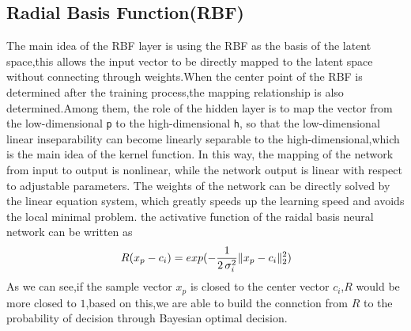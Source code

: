 \subsection{Radial Basis Function(RBF)}
The main idea of the RBF layer is using the RBF as the basis of the latent space,this allows the input vector to be directly mapped to the latent space without connecting through weights.When the center point of the RBF is determined after the training process,the mapping relationship is also determined.Among them, the role of the hidden layer is to map the vector from the low-dimensional \verb+p+ to the high-dimensional \verb+h+, so that the low-dimensional linear inseparability can become linearly separable to the high-dimensional,which is the main idea of the kernel function. In this way, the mapping of the network from input to output is nonlinear, while the network output is linear with respect to adjustable parameters. The weights of the network can be directly solved by the linear equation system, which greatly speeds up the learning speed and avoids the local minimal problem.
the activative function of the raidal basis neural network can be written as
\begin{equation}
\operatorname\\{R}({x}_{p}-{c}_{i})=
\\exp{(-\frac{1}{2\,\sigma_i^2} \Vert {x}_{p}-{c}_{i}\Vert_2^2})
\end{equation}
As we can see,if the sample vector ${x}_{p}$ is closed to the center vector ${c}_{i}$,$R$ would be more closed to $1$,based on this,we are able to build the connction from $R$ to the probability of decision through Bayesian optimal decision.
